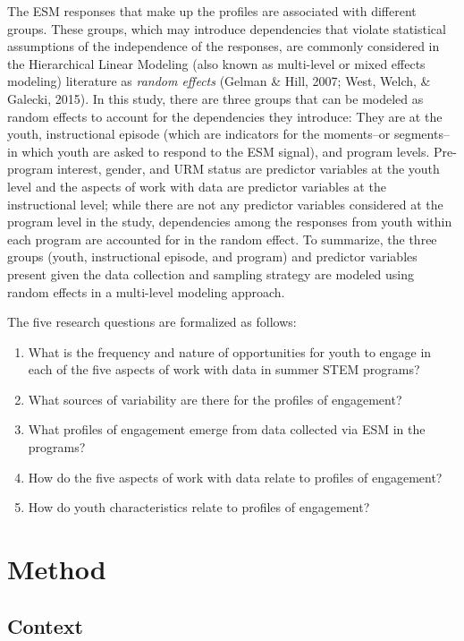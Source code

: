 \documentclass[]{book}
\providecommand{\tightlist}{%
  \setlength{\itemsep}{0pt}\setlength{\parskip}{0pt}}
\theoremstyle{definition}
\theoremstyle{definition}
\theoremstyle{definition}
\theoremstyle{remark}
\begin{document}
The ESM responses that make up the profiles are associated with
different groups. These groups, which may introduce dependencies that
violate statistical assumptions of the independence of the responses,
are commonly considered in the Hierarchical Linear Modeling (also known
as multi-level or mixed effects modeling) literature as \emph{random
effects} (Gelman \& Hill, 2007; West, Welch, \& Galecki, 2015). In this
study, there are three groups that can be modeled as random effects to
account for the dependencies they introduce: They are at the youth,
instructional episode (which are indicators for the moments--or
segments--in which youth are asked to respond to the ESM signal), and
program levels. Pre-program interest, gender, and URM status are
predictor variables at the youth level and the aspects of work with data
are predictor variables at the instructional level; while there are not
any predictor variables considered at the program level in the study,
dependencies among the responses from youth within each program are
accounted for in the random effect. To summarize, the three groups
(youth, instructional episode, and program) and predictor variables
present given the data collection and sampling strategy are modeled
using random effects in a multi-level modeling approach.

The five research questions are formalized as follows:

\begin{enumerate}
\def\labelenumi{\arabic{enumi}.}
\tightlist
\item
  What is the frequency and nature of opportunities for youth to engage
  in each of the five aspects of work with data in summer STEM programs?
\item
  What sources of variability are there for the profiles of engagement?
\item
  What profiles of engagement emerge from data collected via ESM in the
  programs?
\item
  How do the five aspects of work with data relate to profiles of
  engagement?
\item
  How do youth characteristics relate to profiles of engagement?
\end{enumerate}

\chapter{Method}\label{method}

\section{Context}\label{context}
\end{document}
